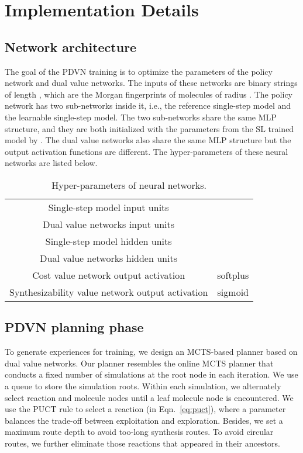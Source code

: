 \documentclass[nohyperref]{article}
\theoremstyle{plain}
\theoremstyle{definition}
\theoremstyle{remark}
\begin{document}
\nocite{langley00}





\newpage
\appendix
\onecolumn




\section{Implementation Details}

\subsection{Network architecture}

The goal of the PDVN training is to optimize the parameters of the policy network and dual value networks. 
The inputs of these networks are binary strings of length , which are the Morgan fingerprints of molecules of radius .
The policy network has two sub-networks inside it, i.e., the reference single-step model and the learnable single-step model. The two sub-networks share the same MLP structure, and they are both initialized with the parameters from the SL trained model by \cite{chen20retrostar}. The dual value networks also share the same MLP structure but the output activation functions are different. The hyper-parameters of these neural networks are listed below.

\begin{table}[h]
\centering
\caption{Hyper-parameters of neural networks.}
\label{tab:hyper}
\begin{tabular}{cc}
\toprule
Single-step model input units &  \\
Dual value networks input units &  \\
Single-step model hidden units &  \\
Dual value networks hidden units &  \\
Cost value network output activation & softplus \\
Synthesizability value network output activation & sigmoid \\
\bottomrule
\end{tabular}
\end{table}

\subsection{PDVN planning phase}

To generate experiences for training, we design an MCTS-based planner based on dual value networks. Our planner resembles the online MCTS planner that conducts a fixed number of simulations at the root node in each iteration. We use a queue to store the simulation roots.
Within each simulation, we alternately select reaction and molecule nodes until a leaf molecule node is encountered. 
We use the PUCT rule to select a reaction (in Eqn.~\ref{eq:puct}), where a parameter  balances the trade-off between exploitation and exploration.
Besides, we set a maximum route depth to avoid too-long synthesis routes. 
To avoid circular routes, we further eliminate those reactions that appeared in their ancestors.
\end{document}
